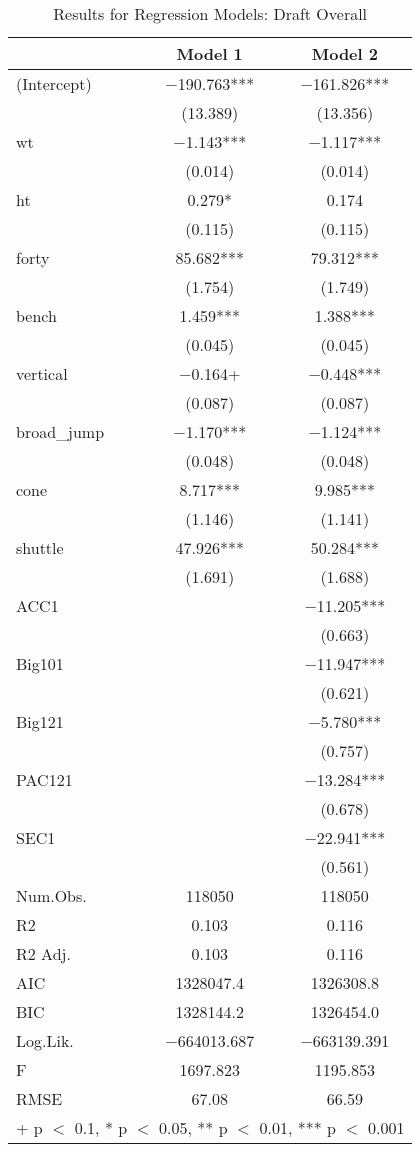 \documentclass[12pt,english]{article}
\begin{document}
\begin{table}
\caption{Results for Regression Models: Draft Overall}
\centering
\begin{tabular}[t]{lcc}
\toprule
  & Model 1 & Model 2\\
\midrule
(Intercept) & \num{-190.763}*** & \num{-161.826}***\\
 & (\num{13.389}) & (\num{13.356})\\
wt & \num{-1.143}*** & \num{-1.117}***\\
 & (\num{0.014}) & (\num{0.014})\\
ht & \num{0.279}* & \num{0.174}\\
 & (\num{0.115}) & (\num{0.115})\\
forty & \num{85.682}*** & \num{79.312}***\\
 & (\num{1.754}) & (\num{1.749})\\
bench & \num{1.459}*** & \num{1.388}***\\
 & (\num{0.045}) & (\num{0.045})\\
vertical & \num{-0.164}+ & \num{-0.448}***\\
 & (\num{0.087}) & (\num{0.087})\\
broad\_jump & \num{-1.170}*** & \num{-1.124}***\\
 & (\num{0.048}) & (\num{0.048})\\
cone & \num{8.717}*** & \num{9.985}***\\
 & (\num{1.146}) & (\num{1.141})\\
shuttle & \num{47.926}*** & \num{50.284}***\\
 & (\num{1.691}) & (\num{1.688})\\
ACC1 &  & \num{-11.205}***\\
 &  & (\num{0.663})\\
Big101 &  & \num{-11.947}***\\
 &  & (\num{0.621})\\
Big121 &  & \num{-5.780}***\\
 &  & (\num{0.757})\\
PAC121 &  & \num{-13.284}***\\
 &  & (\num{0.678})\\
SEC1 &  & \num{-22.941}***\\
 &  & (\num{0.561})\\
\midrule
Num.Obs. & \num{118050} & \num{118050}\\
R2 & \num{0.103} & \num{0.116}\\
R2 Adj. & \num{0.103} & \num{0.116}\\
AIC & \num{1328047.4} & \num{1326308.8}\\
BIC & \num{1328144.2} & \num{1326454.0}\\
Log.Lik. & \num{-664013.687} & \num{-663139.391}\\
F & \num{1697.823} & \num{1195.853}\\
RMSE & \num{67.08} & \num{66.59}\\
\bottomrule
\multicolumn{3}{l}{\rule{0pt}{1em}+ p $<$ 0.1, * p $<$ 0.05, ** p $<$ 0.01, *** p $<$ 0.001}\\
\end{tabular}
\end{table}
\end{document}
